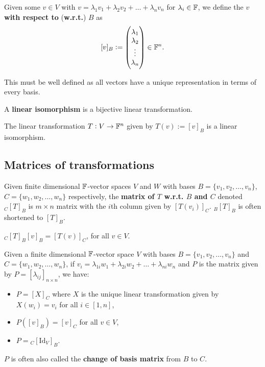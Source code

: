 \begin{definition}
    Given some $v\in V$ with $v = \lambda_1v_1 + \lambda_2v_2 + \dots + \lambda_nv_n$ for $\lambda_i\in\mathbb{F}$, we define the $v$ \textbf{with respect to} (\textbf{w.r.t.}) $B$ as \[
     [v]_B := \begin{pmatrix}
         \lambda_1 \\
         \lambda_2 \\
         \vdots \\
         \lambda_n
     \end{pmatrix} \in \mathbb{F}^n
     \textcolor{black}{.}
    \]
\end{definition}

\begin{remark}
    This must be well defined as all vectors have a unique representation in terms of every basis.
\end{remark}

\begin{definition}
    A \textbf{linear isomorphism} is a bijective linear transformation.
\end{definition}

\begin{theorem}
    The linear transformation $T:V\rightarrow\mathbb{F}^n$ given by $T(v):= [v]_B$ is a linear isomorphism.
\end{theorem}

\subsection{Matrices of transformations}
\begin{definition}
    Given finite dimensional $\mathbb{F}$-vector spaces $V$ and $W$ with bases $B = \{v_1,v_2,\ldots,v_n\}$, $C = \{w_1,w_2,\ldots,w_n\}$ respectively, the \textbf{matrix of $T$ w.r.t. $B$ and $C$} denoted $_C[T]_B$ is $m\times n$ matrix with the $i$th column given by $[T(v_i)]_C$. $_B[T]_B$ is often shortened to $[T]_B$.
\end{definition}

\begin{remark}
    $_C[T]_B[v]_B = [T(v)]_C$, for all $v\in V$.
\end{remark}

\begin{theorem}
    Given a finite dimensional $\mathbb{F}$-vector space $V$ with bases $B = \{v_1,v_2,\ldots,v_n\}$ and $C = \{w_1,w_2,\ldots,w_n\}$, if $v_i = \lambda_{1i}w_1 + \lambda_{2i}w_2 + \ldots + \lambda_{ni}w_n$ and $P$ is the matrix given by $P=[\lambda_{ij}]_{n\times n}$, we have: \begin{itemize}
        \item $P=[X]_C$ where $X$ is the unique linear transformation given by $X(w_i)=v_i$ for all $i\in[1,n]$,
        \item $P([v]_B) = [v]_C$ for all $v\in V$,
        \item $P= {}_C[\text{Id}_V]_B$.
    \end{itemize}
    $P$ is often also called the \textbf{change of basis matrix} from $B$ to $C$.
\end{theorem}

